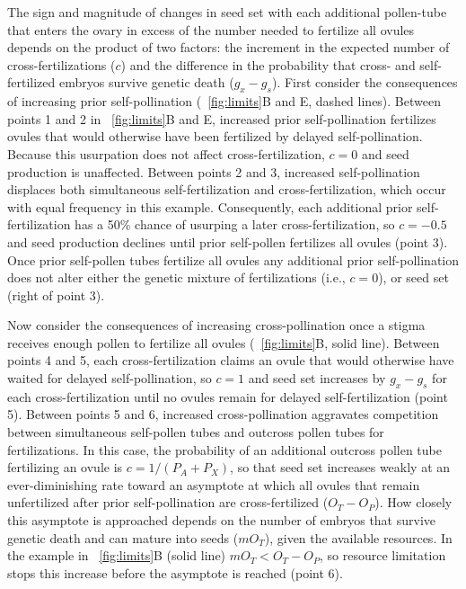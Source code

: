 \documentclass[letterpaper,titlepage]{scrartcl}
\begin{document}
The sign and magnitude of changes in seed set with each additional
pollen-tube that enters the ovary in excess of the number needed to
fertilize all ovules depends on the product of two factors: the
increment in the expected number of cross-fertilizations ($c$) and the
difference in the probability that cross- and self-fertilized embryos
survive genetic death ($g_{x}-g_{s}$). First consider the consequences
of increasing prior self-pollination ({\fref}~\ref{fig:limits}B and E,
dashed lines). Between points 1 and 2 in {\fref}~\ref{fig:limits}B and
E, increased prior self-pollination fertilizes ovules that would
otherwise have been fertilized by delayed self-pollination. Because
this usurpation does not affect cross-fertilization, $c=0$ and seed
production is unaffected. Between points 2 and 3, increased
self-pollination displaces both simultaneous self-fertilization and
cross-fertilization, which occur with equal frequency in this
example. Consequently, each additional prior self-fertilization has a
50\% chance of usurping a later cross-fertilization, so $c=-0.5$ and
seed production declines until prior self-pollen fertilizes all ovules
(point 3). Once prior self-pollen tubes fertilize all ovules any
additional prior self-pollination does not alter either the genetic
mixture of fertilizations (i.e., $c=0$), or seed set (right of point
3).

Now consider the consequences of increasing cross-pollination once a
stigma receives enough pollen to fertilize all ovules
({\fref}~\ref{fig:limits}B, solid line). Between points 4 and 5, each
cross-fertilization claims an ovule that would otherwise have waited
for delayed self-pollination, so $c=1$ and seed set increases by
$g_{x} - g_{s}$ for each cross-fertilization until no ovules remain for
delayed self-fertilization (point 5). Between points 5 and 6,
increased cross-pollination aggravates competition between
simultaneous self-pollen tubes and outcross pollen tubes for
fertilizations. In this case, the probability of an additional
outcross pollen tube fertilizing an ovule is
$c=1/(P_{A} + P_{X})$, so that seed set increases weakly at an
ever-diminishing rate toward an asymptote at which all ovules that
remain unfertilized after prior self-pollination are cross-fertilized
($O_{T} - O_{P}$). How closely this asymptote is approached depends on
the number of embryos that survive genetic death and can mature into
seeds ($mO_{T}$), given the available resources. In the example in
{\fref}~\ref{fig:limits}B (solid line) $mO_{T} < O_{T} - O_{P}$, so
resource limitation stops this increase before the asymptote is
reached (point 6).
\end{document}
